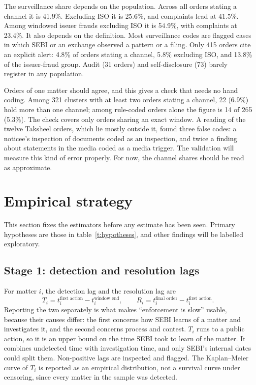 \documentclass[letterpaper,11pt,leqno]{article}
\begin{document}
The surveillance share depends on the population. Across all orders stating a channel it is 41.9\%. Excluding ISO it is 25.6\%, and complaints lead at 41.5\%. Among windowed issuer frauds excluding ISO it is 54.9\%, with complaints at 23.4\%. It also depends on the definition. Most surveillance codes are flagged cases in which SEBI or an exchange observed a pattern or a filing. Only 415 orders cite an explicit alert: 4.8\% of orders stating a channel, 5.8\% excluding ISO, and 13.8\% of the issuer-fraud group. Audit (31 orders) and self-disclosure (73) barely register in any population.

Orders of one matter should agree, and this gives a check that needs no hand coding. Among 321 clusters with at least two orders stating a channel, 22 (6.9\%) hold more than one channel; among rule-coded orders alone the figure is 14 of 265 (5.3\%). The check covers only orders sharing an exact window. A reading of the twelve Taksheel orders, which lie mostly outside it, found three false codes: a noticee's inspection of documents coded as an inspection, and twice a finding about statements in the media coded as a media trigger. The validation will measure this kind of error properly. For now, the channel shares should be read as approximate.

\section{Empirical strategy}\label{s:strategy}

This section fixes the estimators before any estimate has been seen. Primary hypotheses are those in table~\ref{t:hypotheses}, and other findings will be labelled exploratory.

\subsection{Stage 1: detection and resolution lags}\label{s:stage1}

For matter $i$, the detection lag and the resolution lag are
\begin{equation}
T_i = t_i^{\text{first action}} - t_i^{\text{window end}}, \qquad R_i = t_i^{\text{final order}} - t_i^{\text{first action}}.
\label{e:lags}\end{equation}
Reporting the two separately is what makes ``enforcement is slow'' usable, because their causes differ: the first concerns how SEBI learns of a matter and investigates it, and the second concerns process and contest. $T_i$ runs to a public action, so it is an upper bound on the time SEBI took to learn of the matter. It combines undetected time with investigation time, and only SEBI's internal dates could split them. Non-positive lags are inspected and flagged. The Kaplan--Meier curve of $T_i$ is reported as an empirical distribution, not a survival curve under censoring, since every matter in the sample was detected.
\end{document}
